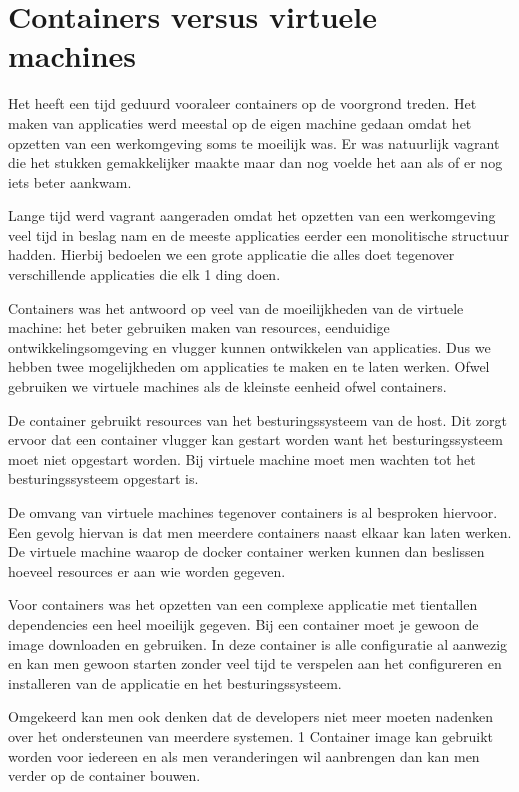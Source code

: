 \documentclass[pdftex,a4paper,12pt,twoside]{report}
\begin{document}
\section{Containers versus virtuele machines}

Het heeft een tijd geduurd vooraleer containers op de voorgrond treden. Het maken van applicaties werd meestal op de eigen machine gedaan omdat het opzetten van een werkomgeving soms te moeilijk was. Er was natuurlijk vagrant die het stukken gemakkelijker maakte maar dan nog voelde het aan als of er nog iets beter aankwam. 

Lange tijd werd vagrant aangeraden omdat het opzetten van een werkomgeving veel tijd in beslag nam en de meeste applicaties eerder een monolitische structuur hadden. Hierbij bedoelen we een grote applicatie die alles doet tegenover verschillende applicaties die elk 1 ding doen.

Containers was het antwoord op veel van de moeilijkheden van de virtuele machine: het beter gebruiken maken van resources, eenduidige ontwikkelingsomgeving en vlugger kunnen ontwikkelen van applicaties. Dus we hebben twee mogelijkheden om applicaties te maken en te laten werken. Ofwel gebruiken we virtuele machines als de kleinste eenheid ofwel containers.

De container gebruikt resources van het besturingssysteem van de host. Dit zorgt ervoor dat een container vlugger kan gestart worden want het besturingssysteem moet niet opgestart worden. Bij virtuele machine moet men wachten tot het besturingssysteem opgestart is. 

De omvang van virtuele machines tegenover containers is al besproken hiervoor. Een gevolg hiervan is dat men meerdere containers naast elkaar kan laten werken. De virtuele machine waarop de docker container werken kunnen dan beslissen hoeveel resources er aan wie worden gegeven.

Voor containers was het opzetten van een complexe applicatie met tientallen dependencies een heel moeilijk gegeven. Bij een container moet je gewoon de image downloaden en gebruiken. In deze container is alle configuratie al aanwezig en kan men gewoon starten zonder veel tijd te verspelen aan het configureren en installeren van de applicatie en het besturingssysteem.

Omgekeerd kan men ook denken dat de developers niet meer moeten nadenken over het ondersteunen van meerdere systemen. 1 Container image kan gebruikt worden voor iedereen en als men veranderingen wil aanbrengen dan kan men verder op de container bouwen. 
\end{document}
